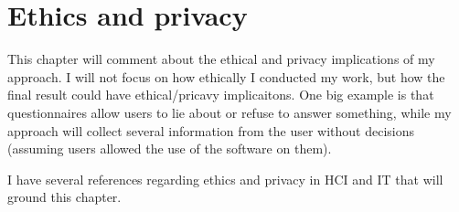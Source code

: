 \chapter{Ethics and privacy}
\label{ch:ethics}

This chapter will comment about the ethical and privacy implications of my approach. I will not focus on how ethically I conducted my work, but how the final result could have ethical/pricavy implicaitons. One big example is that questionnaires allow users to lie about or refuse to answer something, while my approach will collect several information from the user without decisions (assuming users allowed the use of the software on them).

I have several references regarding ethics and privacy in HCI and IT that will ground this chapter.
